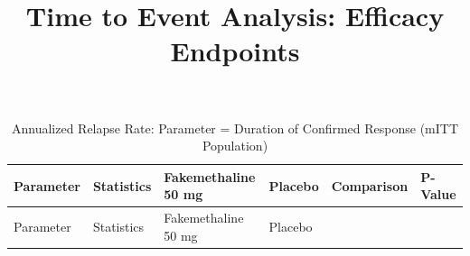 \documentclass[
  10pt,
  letterpaper,
  DIV=11,
  numbers=noendperiod]{scrartcl}
\title{Time to Event Analysis: Efficacy Endpoints}
\author{}
\date{}
\begin{document}
\maketitle

\listoffigures
\listoftables

\newpage

\begin{longtable}[]{@{}
  >{\raggedright\arraybackslash}p{}
  >{\raggedright\arraybackslash}p{}
  >{\raggedright\arraybackslash}p{}
  >{\raggedright\arraybackslash}p{}
  >{\raggedright\arraybackslash}p{}
  >{\raggedright\arraybackslash}p{}@{}}
\caption{Annualized Relapse Rate: Parameter = Duration of Confirmed
Response (mITT Population)}\tabularnewline
\toprule\noalign{}
\begin{minipage}[b]{\linewidth}\raggedright
Parameter
\end{minipage} & \begin{minipage}[b]{\linewidth}\raggedright
Statistics
\end{minipage} & \begin{minipage}[b]{\linewidth}\raggedright
Fakemethaline 50 mg
\end{minipage} & \begin{minipage}[b]{\linewidth}\raggedright
Placebo
\end{minipage} & \begin{minipage}[b]{\linewidth}\raggedright
Comparison
\end{minipage} & \begin{minipage}[b]{\linewidth}\raggedright
P-Value
\end{minipage} \\
\midrule\noalign{}
\endfirsthead
\toprule\noalign{}
\begin{minipage}[b]{\linewidth}\raggedright
Parameter
\end{minipage} & \begin{minipage}[b]{\linewidth}\raggedright
Statistics
\end{minipage} & \begin{minipage}[b]{\linewidth}\raggedright
Fakemethaline 50 mg
\end{minipage} & \begin{minipage}[b]{\linewidth}\raggedright
Placebo
\end{minipage} & \begin{minipage}[b]{\linewidth}\raggedright

\end{minipage}
\end{longtable}
\end{document}
